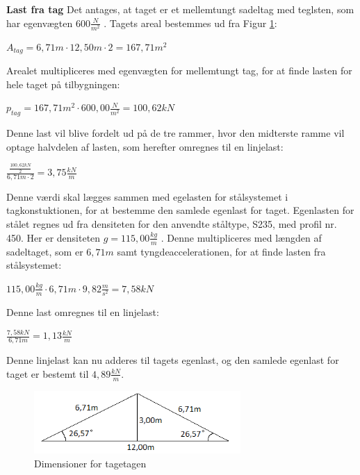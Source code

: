 \textbf{Last fra tag}
\newline
Det antages, at taget er et mellemtungt sadeltag med teglsten, som har egenvægten $600 \frac{N}{m^2}$ \citep{tag}.
\newline
\newline
Tagets areal bestemmes ud fra Figur \ref{fig:tagetage}:
\begin{center}
	$A_{tag} = 6,\!71 m\cdot 12,\!50 m \cdot 2=167,\!71 m^2$
\end{center}

Arealet multipliceres med egenvægten for mellemtungt tag, for at finde lasten for hele taget på tilbygningen:
\begin{center}
	$p_{tag} = 167,\!71 m^2\cdot 600,\!00 \frac{N}{m^2}=100,\!62 kN$
\end{center}

Denne last vil blive fordelt ud på de tre rammer, hvor den midterste ramme vil optage halvdelen af lasten, som herefter omregnes til en linjelast:
\begin{center}
	$\frac{\frac{100,\!62kN}{2}}{6,\!71m \cdot2} = 3,\!75 \frac{kN}{m}$
\end{center}

Denne værdi skal lægges sammen med egelasten for stålsystemet i tagkonstuktionen, for at bestemme den samlede egenlast for taget.
\newline \indent{     }  Egenlasten for stålet regnes ud fra densiteten for den anvendte ståltype, S235, med profil nr. 450. Her er densiteten $g = 115,\!00\frac{kg}{m}$ \citep{stabi}. Denne multipliceres med længden af sadeltaget, som er $6,\!71 m$ samt tyngdeaccelerationen, for at finde lasten fra stålsystemet:

\begin{center}
	$115,\!00 \frac{kg}{m}\cdot 6,\!71m \cdot 9,\!82\frac{m}{s^2} = 7,\!58 kN$
\end{center}

Denne last omregnes til en linjelast: 
\begin{center}
	$\frac{7,\!58 kN}{6,\!71m}= 1,\!13 \frac{kN}{m}$
\end{center}

Denne linjelast kan nu adderes til tagets egenlast, og den samlede egenlast for taget er bestemt til $4,\!89 \frac{kN}{m}$. 

\begin{figure}[H]
	\centering
	\includegraphics[width=0.7\textwidth]{billeder/Tagmedvinkel.png}
	\caption{Dimensioner for tagetagen}
	\label{fig:tagetage}
\end{figure}

